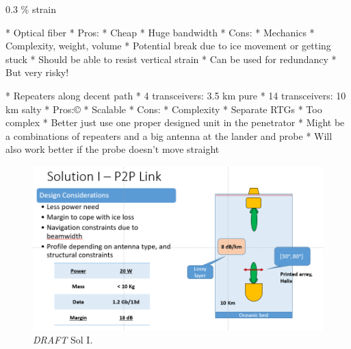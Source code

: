 0.3 \% strain

\cite[p. 76]{book:communication}


* Optical fiber
	* Pros:
		* Cheap
		* Huge bandwidth
	* Cons:
		* Mechanics %
			* Complexity, weight, volume
		* Potential break due to ice movement or getting stuck
	* Should be able to resist vertical strain
	* Can be used for redundancy
		* But very risky!



* Repeaters along decent path
	* 4 transceivers: 3.5 km pure
	* 14 transceivers: 10 km salty
	* Pros:©
		* Scalable
	* Cons:
		* Complexity
		* Separate RTGs
	* Too complex
		* Better just use one proper designed unit in the penetrator
		* Might be a combinations of repeaters and a big antenna at the lander and probe
		* Will also work better if the probe doesn't move straight

\begin{figure}[htb]
	\centering
	\includegraphics[width=\textwidth]{figures/comms/iceLink-p2p-HighD}
	\caption{ \textit{DRAFT} Sol I.}
	\label{fig:iceLink-p2p-HighD}
\end{figure}

